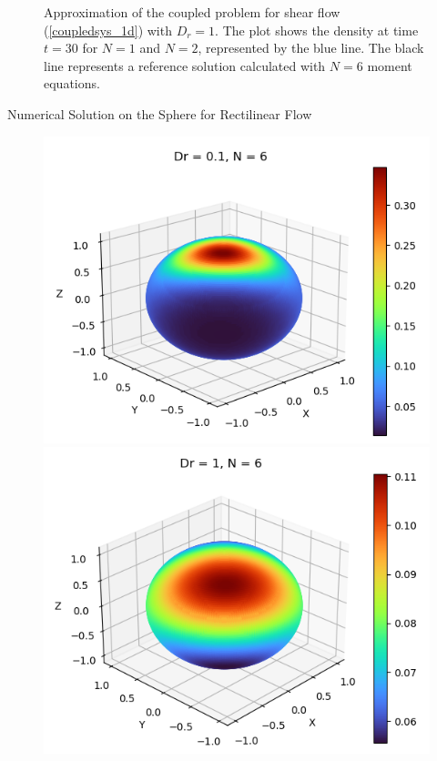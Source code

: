 \begin{frame}
\begin{figure}
\begin{minipage}{0.46\textwidth}
		\end{minipage}
		\caption{Approximation of the coupled problem for shear flow (\ref{coupledsys_1d}) with $D_r =1$. The plot shows the density at time $t=30$ for $N = 1$ and $N = 2$, represented by the blue line. The black line represents a reference solution calculated with $N = 6$ moment equations.}
		\label{ClusterFormation_Dr=1}
	\end{figure}
\end{frame}



\begin{frame}{Numerical Solution on the Sphere for Rectilinear Flow}
	\scriptsize
	\begin{figure}[H]
		\centering
		\begin{minipage}{0.4\textwidth}
			\includegraphics[scale=0.4]{Bilder_wxwy/Sol_onSphere_wxwy_Dr=0.1_N=6}
		\end{minipage}
		\hfill 
		\begin{minipage}{0.4\textwidth}
			\includegraphics[scale=0.4]{Bilder_wxwy/Sol_onSphere_wxwy_Dr=1_N=6}

\end{minipage}
\end{figure}
\end{frame}
